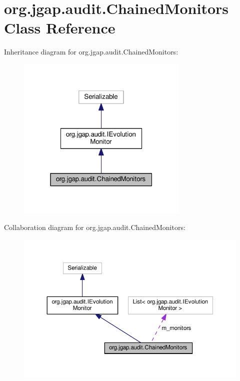 \hypertarget{classorg_1_1jgap_1_1audit_1_1_chained_monitors}{\section{org.\-jgap.\-audit.\-Chained\-Monitors Class Reference}
\label{classorg_1_1jgap_1_1audit_1_1_chained_monitors}
}


Inheritance diagram for org.\-jgap.\-audit.\-Chained\-Monitors\-:
\nopagebreak
\begin{figure}[H]
\begin{center}
\leavevmode
\includegraphics[width=232pt]{classorg_1_1jgap_1_1audit_1_1_chained_monitors__inherit__graph}
\end{center}
\end{figure}


Collaboration diagram for org.\-jgap.\-audit.\-Chained\-Monitors\-:
\nopagebreak
\begin{figure}[H]
\begin{center}
\leavevmode
\includegraphics[width=350pt]{classorg_1_1jgap_1_1audit_1_1_chained_monitors__coll__graph}
\end{center}
\end{figure}
